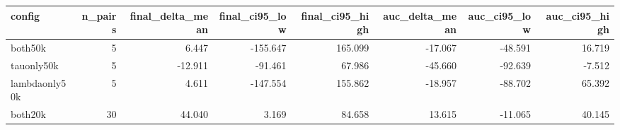 \begin{tabular}{lrrrrrrr}
\toprule
config & n_pairs & final_delta_mean & final_ci95_low & final_ci95_high & auc_delta_mean & auc_ci95_low & auc_ci95_high \\
\midrule
both50k & 5 & 6.447 & -155.647 & 165.099 & -17.067 & -48.591 & 16.719 \\
tauonly50k & 5 & -12.911 & -91.461 & 67.986 & -45.660 & -92.639 & -7.512 \\
lambdaonly50k & 5 & 4.611 & -147.554 & 155.862 & -18.957 & -88.702 & 65.392 \\
both20k & 30 & 44.040 & 3.169 & 84.658 & 13.615 & -11.065 & 40.145 \\
\bottomrule
\end{tabular}
